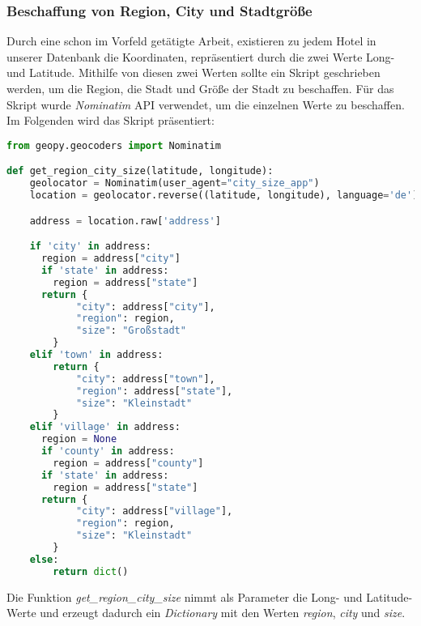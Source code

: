 \subsubsection{Beschaffung von Region, City und Stadtgröße}
\label{subsubsec:region_city_size}
Durch eine schon im Vorfeld getätigte Arbeit, existieren zu jedem Hotel in unserer Datenbank die Koordinaten, repräsentiert durch die zwei Werte Long- und Latitude. Mithilfe von diesen zwei Werten sollte ein Skript geschrieben werden, um die Region, die Stadt und Größe der Stadt zu beschaffen. 
\newline
\newline
Für das Skript wurde \emph{Nominatim} API verwendet, um die einzelnen Werte zu beschaffen. Im Folgenden wird das Skript präsentiert:

\begin{lstlisting}[language=Python, label=lst:RS_Demo, caption=Einfaches Recommendation System für Film vorschläge]
    from geopy.geocoders import Nominatim

def get_region_city_size(latitude, longitude):
    geolocator = Nominatim(user_agent="city_size_app")
    location = geolocator.reverse((latitude, longitude), language='de')

    address = location.raw['address']

    if 'city' in address:
      region = address["city"]
      if 'state' in address:
        region = address["state"]
      return {
            "city": address["city"],
            "region": region,
            "size": "Großstadt"
        }
    elif 'town' in address:
        return {
            "city": address["town"],
            "region": address["state"],
            "size": "Kleinstadt"
        }
    elif 'village' in address:
      region = None
      if 'county' in address:
        region = address["county"]
      if 'state' in address:
        region = address["state"]
      return {
            "city": address["village"],
            "region": region,
            "size": "Kleinstadt"
        }
    else:
        return dict()
\end{lstlisting}

Die Funktion \emph{get\_region\_city\_size} nimmt als Parameter die Long- und Latitude-Werte und erzeugt dadurch ein \emph{Dictionary} mit den Werten \emph{region}, \emph{city} und \emph{size}.